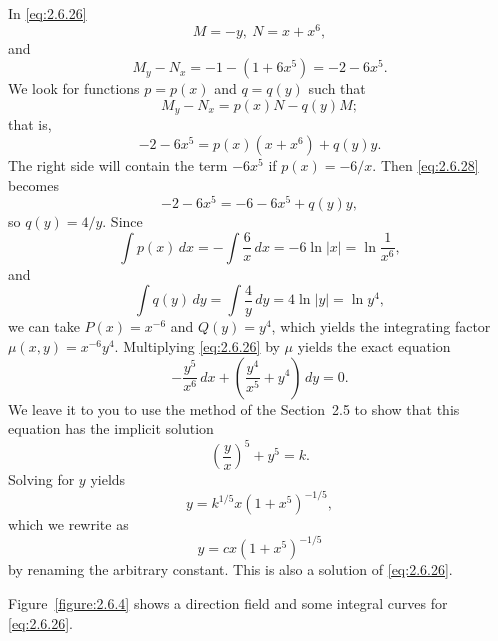 \begin{examplesolution}
\solution In \eqref{eq:2.6.26}
\[
  M=-y,\ N=x+x^{6},
\]
and
\[
  M_{y}-N_{x}=-1-(1+6x^{5})=-2-6x^{5}.
\]
We look for functions $p=p(x)$ and $q=q(y)$ such that
\[
  M_{y}-N_{x}=p(x)N-q(y)M;
\]
that is,
\begin{equation}
  \label{eq:2.6.28}-2-6x^{5}=p(x)(x+x^{6})+q(y)y.
\end{equation}
The right side will contain the term $-6x^{5}$ if $p(x)=-6/x$. Then \eqref{eq:2.6.28} becomes
\[
  -2-6x^{5}=-6-6x^{5}+q(y)y,
\]
so $q(y)=4/y$. Since
\[
  \int p(x)\,dx=-\int\frac{6}{x}\,dx=-6\ln|x|=\ln\frac{1}{x^{6}},
\]
and
\[
  \int q(y)\,dy=\int\frac{4}{y}\,dy=4\ln |y|=\ln{y^{4}},
\]
we can take $P(x)=x^{-6}$ and $Q(y)=y^{4}$, which yields the integrating factor
$\mu(x,y)=x^{-6}y^{4}$. Multiplying \eqref{eq:2.6.26} by $\mu$ yields the exact equation
\[
  -\frac{y^{5}}{x^{6}}\,dx+\left(\frac{y^{4}}{x^{5}}+y^{4}\right) \,dy=0.
\]
We leave it to you to use the method of the Section~2.5 to show that this equation has the implicit
solution
\[
  \left(\frac{y}{x}\right)^{5}+y^{5}=k.
\]
Solving for $y$ yields
\[
  y=k^{1/5}x(1+x^{5})^{-1/5},
\]
which we rewrite as
\[
  y=cx(1+x^{5})^{-1/5}
\]
by renaming the arbitrary constant. This is also a solution of \eqref{eq:2.6.26}.

Figure~\ref{figure:2.6.4} shows a direction field and some integral curves for \eqref{eq:2.6.26}.
\end{examplesolution}

